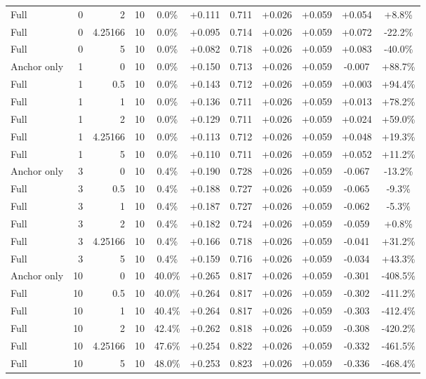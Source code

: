 \begin{table}[htbp]
\begin{tabular}{lrrrccccccc}
Full & 0 & 2 & 10 & 0.0\% & +0.111 & 0.711 & +0.026 & +0.059 & +0.054 & +8.8\% \\
Full & 0 & 4.25166 & 10 & 0.0\% & +0.095 & 0.714 & +0.026 & +0.059 & +0.072 & -22.2\% \\
Full & 0 & 5 & 10 & 0.0\% & +0.082 & 0.718 & +0.026 & +0.059 & +0.083 & -40.0\% \\
Anchor only & 1 & 0 & 10 & 0.0\% & +0.150 & 0.713 & +0.026 & +0.059 & -0.007 & +88.7\% \\
Full & 1 & 0.5 & 10 & 0.0\% & +0.143 & 0.712 & +0.026 & +0.059 & +0.003 & +94.4\% \\
Full & 1 & 1 & 10 & 0.0\% & +0.136 & 0.711 & +0.026 & +0.059 & +0.013 & +78.2\% \\
Full & 1 & 2 & 10 & 0.0\% & +0.129 & 0.711 & +0.026 & +0.059 & +0.024 & +59.0\% \\
Full & 1 & 4.25166 & 10 & 0.0\% & +0.113 & 0.712 & +0.026 & +0.059 & +0.048 & +19.3\% \\
Full & 1 & 5 & 10 & 0.0\% & +0.110 & 0.711 & +0.026 & +0.059 & +0.052 & +11.2\% \\
Anchor only & 3 & 0 & 10 & 0.4\% & +0.190 & 0.728 & +0.026 & +0.059 & -0.067 & -13.2\% \\
Full & 3 & 0.5 & 10 & 0.4\% & +0.188 & 0.727 & +0.026 & +0.059 & -0.065 & -9.3\% \\
Full & 3 & 1 & 10 & 0.4\% & +0.187 & 0.727 & +0.026 & +0.059 & -0.062 & -5.3\% \\
Full & 3 & 2 & 10 & 0.4\% & +0.182 & 0.724 & +0.026 & +0.059 & -0.059 & +0.8\% \\
Full & 3 & 4.25166 & 10 & 0.4\% & +0.166 & 0.718 & +0.026 & +0.059 & -0.041 & +31.2\% \\
Full & 3 & 5 & 10 & 0.4\% & +0.159 & 0.716 & +0.026 & +0.059 & -0.034 & +43.3\% \\
Anchor only & 10 & 0 & 10 & 40.0\% & +0.265 & 0.817 & +0.026 & +0.059 & -0.301 & -408.5\% \\
Full & 10 & 0.5 & 10 & 40.0\% & +0.264 & 0.817 & +0.026 & +0.059 & -0.302 & -411.2\% \\
Full & 10 & 1 & 10 & 40.4\% & +0.264 & 0.817 & +0.026 & +0.059 & -0.303 & -412.4\% \\
Full & 10 & 2 & 10 & 42.4\% & +0.262 & 0.818 & +0.026 & +0.059 & -0.308 & -420.2\% \\
Full & 10 & 4.25166 & 10 & 47.6\% & +0.254 & 0.822 & +0.026 & +0.059 & -0.332 & -461.5\% \\
Full & 10 & 5 & 10 & 48.0\% & +0.253 & 0.823 & +0.026 & +0.059 & -0.336 & -468.4\% \\

\end{tabular}
\end{table}
